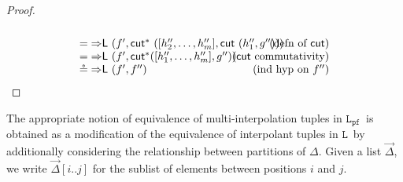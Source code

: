 \documentclass[a4paper,UKenglish,cleveref,autoref,thm-restate, anonymous]{lipics-v2021}
\renewcommand{\vec}[1]{\overrightarrow{#1}}
\newcommand{\Rarr}{\Rightarrow}
\newcommand{\Rs}{\Rightarrow^*}
\newcommand{\mf}[1]{\mathsf{#1}}
\newcommand{\GD}{\Delta}
\renewcommand{\L}{$\mathtt{L}$}
\newcommand{\LPfree}{$\mathtt{L_{pf}}$}
\newcommand{\Rl}{{\Rarr}\mathsf{L}}
\newcommand{\Rsl}{{\Rs}\mathsf{L}}
\newcommand{\Rsr}{{\Rs}\mathsf{R}}
\newcommand{\cut}{\mf{cut}}
\newcommand{\cuts}{\mf{cut}^*}
\begin{document}
\begin{proof}
\[\begin{array}{lr}
      \\
      = \Rl \ (f' , \cuts \ ([h''_2,\dots,h''_m] , \cut \ (h''_1,g'')))
      &\hspace*{-2cm}\text{(defn of $\cut$)}
      \\
      = \Rl \ (f' , \cuts ([h''_1,\dots,h''_m], g'')) 
      &\hspace*{-2cm}\text{($\cut$ commutativity)}
      \\
      \circeq \Rl \ (f' , f'')&\hspace*{-2cm}\text{(ind hyp on $f''$)}
    \end{array}
  \]
\end{proof}
The appropriate notion of equivalence of multi-interpolation tuples in \LPfree\ is obtained as a modification of the equivalence of interpolant tuples in \L\ by additionally considering the relationship between partitions of $\GD$.
Given a list $\vec{\GD}$, we write $\vec{\GD}[i..j]$ for the sublist of elements between positions $i$ and $j$.
\end{document}
